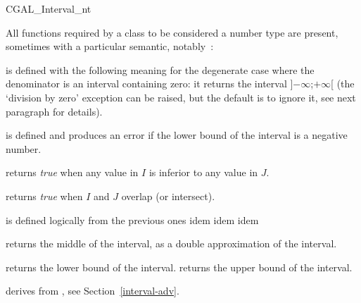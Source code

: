\begin{ccClass} {CGAL_Interval_nt}




\ccOperations
{}

All functions required by a class to be considered a {\cgal} number type are
present, sometimes with a particular semantic, notably~:


 {is defined with the
following meaning for the degenerate case where the denominator is an interval
containing zero: it returns the interval ]$-\infty$;$+\infty$[ (the `division
by zero' exception can be raised, but the default is to ignore it, see next
paragraph for details).}

 {is defined and
produces an error if the lower bound of the interval is a negative number.}

 {returns {\it true} when any
value in $I$ is inferior to any value in $J$.}

 {returns {\it true} when $I$
and $J$ overlap (or intersect).}

 {is defined logically from the
previous ones}
 {idem}
 {idem}
 {idem}

 {returns the
middle of the interval, as a double approximation of the interval.}

 {returns the lower bound of the interval.}
 {returns the upper bound of the interval.}

\ccImplementation

 derives from , 
see Section~\ref{interval-adv}.


\end{ccClass}
